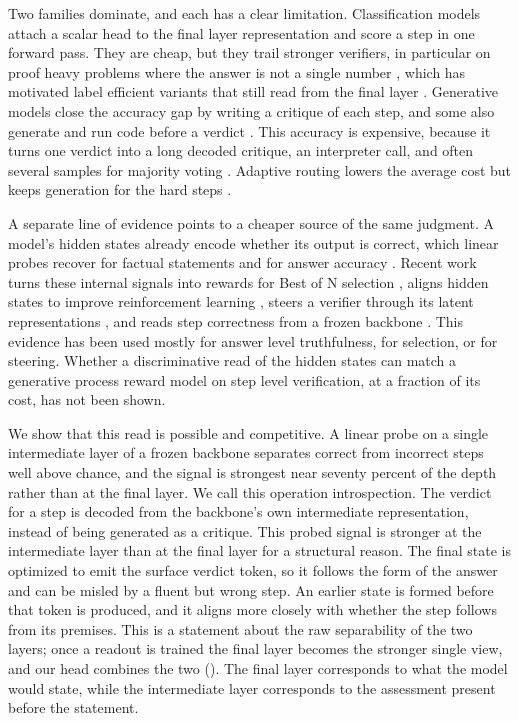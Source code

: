 Two families dominate, and each has a clear limitation. Classification models attach a scalar head to the final layer representation and score a step in one forward pass. They are cheap, but they trail stronger verifiers, in particular on proof heavy problems where the answer is not a single number \citep{zheng2024processbench, zhang2025lessons}, which has motivated label efficient variants that still read from the final layer \citep{yuan2024free, sun2025freeprm}. Generative models close the accuracy gap by writing a critique of each step, and some also generate and run code before a verdict \citep{zhang2024genrm, zhao2025genprm, xiong2025stepwiser, khalifa2025thinkprm}. This accuracy is expensive, because it turns one verdict into a long decoded critique, an interpreter call, and often several samples for majority voting \citep{snell2024scaling}. Adaptive routing lowers the average cost but keeps generation for the hard steps \citep{zhong2025dyve}.

A separate line of evidence points to a cheaper source of the same judgment. A model's hidden states already encode whether its output is correct, which linear probes recover for factual statements and for answer accuracy \citep{azaria2023internal, kadavath2022language, burns2022discovering, marks2023geometry, orgad2024llms, liu2024universal}. Recent work turns these internal signals into rewards for Best of N selection \citep{guo2025mining}, aligns hidden states to improve reinforcement learning \citep{wang2026rightmakesmight}, steers a verifier through its latent representations \citep{zhou2026hidden, hsu2026refine}, and reads step correctness from a frozen backbone \citep{ni2025reprobe}. This evidence has been used mostly for answer level truthfulness, for selection, or for steering. Whether a discriminative read of the hidden states can match a generative process reward model on step level verification, at a fraction of its cost, has not been shown.

We show that this read is possible and competitive. A linear probe on a single intermediate layer of a frozen backbone separates correct from incorrect steps well above chance, and the signal is strongest near seventy percent of the depth rather than at the final layer. We call this operation introspection. The verdict for a step is decoded from the backbone's own intermediate representation, instead of being generated as a critique. This probed signal is stronger at the intermediate layer than at the final layer for a structural reason. The final state is optimized to emit the surface verdict token, so it follows the form of the answer and can be misled by a fluent but wrong step. An earlier state is formed before that token is produced, and it aligns more closely with whether the step follows from its premises. This is a statement about the raw separability of the two layers; once a readout is trained the final layer becomes the stronger single view, and our head combines the two (). The final layer corresponds to what the model would state, while the intermediate layer corresponds to the assessment present before the statement.

